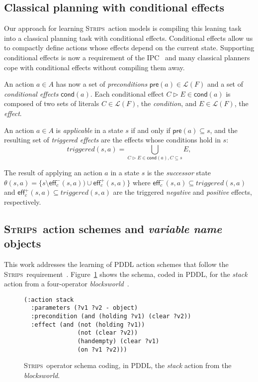 \documentclass{article}
\newcommand{\pre}{\mathsf{pre}}     %
\newcommand{\eff}{\mathsf{eff}}     %
\newcommand{\cond}{\mathsf{cond}}   %
\newcommand{\strips}{\textsc{Strips}}     %
\begin{document}
\subsection{Classical planning with conditional effects}
Our approach for learning \strips\ action models is compiling this leaning task into a classical planning task with conditional effects. Conditional effects allow us to compactly define actions whose effects depend on the current state. Supporting conditional effects is now a requirement of the IPC~\cite{vallati:IPC:AIM2015} and many classical planners cope with conditional effects without compiling them away.

An action $a\in A$ has now a set of {\em preconditions} $\pre(a)\in\mathcal{L}(F)$ and a set of {\em conditional effects} $\cond(a)$. Each conditional effect $C\rhd E\in\cond(a)$ is composed of two sets of literals $C\in\mathcal{L}(F)$, the {\em condition}, and $E\in\mathcal{L}(F)$, the {\em effect}.

An action $a\in A$ is {\em applicable} in a state $s$ if and only if $\pre(a)\subseteq s$, and the resulting set of {\em triggered effects} are the effects whose conditions hold in $s$:
\[
triggered(s,a)=\bigcup_{C\rhd E\in\cond(a),C\subseteq s} E,
\]

The result of applying an action $a$ in a state $s$ is the {\em successor} state $\theta(s,a)=\{s\setminus\eff_c^-(s,a))\cup\eff_c^+(s,a)\}$ where $\eff_c^-(s,a)\subseteq triggered(s,a)$ and $\eff_c^+(s,a)\subseteq triggered(s,a)$ are the triggered {\em negative} and {\em positive} effects, respectively.


\subsection{\strips\ action schemes and {\em variable name} objects}
This work addresses the learning of PDDL action schemes that follow the \strips\ requirement~\cite{mcdermott1998pddl,fox2003pddl2}. Figure~\ref{fig:stack} shows the schema, coded in PDDL, for the {\em stack} action from a four-operator {\em blocksworld}~\cite{slaney2001blocks}.

\begin{figure}
\begin{footnotesize}
\begin{verbatim}
(:action stack
  :parameters (?v1 ?v2 - object)
  :precondition (and (holding ?v1) (clear ?v2))
  :effect (and (not (holding ?v1))
               (not (clear ?v2))
               (handempty) (clear ?v1)
               (on ?v1 ?v2)))
\end{verbatim}
\end{footnotesize}
 \caption{\small \strips\ operator schema coding, in PDDL, the {\em stack} action from the {\em blocksworld}.}
\label{fig:stack}
\end{figure}
\end{document}
